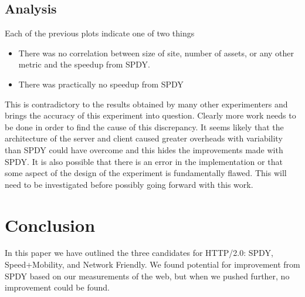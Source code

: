 \documentclass[10pt,letterpaper,notitlepage]{article}
\begin{document}
\subsection{Analysis}
\label{sec:realworld/analysis}
Each of the previous plots indicate one of two things
\begin{itemize}
    \item  There was no correlation between size of site, number of assets, or
        any other metric and the speedup from SPDY.
    \item There was practically no speedup from SPDY
\end{itemize}

This is contradictory to the results obtained by many other experimenters and
brings the accuracy of this experiment into question.  Clearly more work needs
to be done in order to find the cause of this discrepancy.  It seems likely that
the architecture of the server and client caused greater overheads with
variability than SPDY could have overcome and this hides the improvements made
with SPDY. It is also possible that there is an error in the implementation or
that some aspect of the design of the experiment is fundamentally flawed.  This
will need to be investigated before possibly going forward with this work.

\section{Conclusion}
\label{sec:conlusion}
In this paper we have outlined the three candidates for HTTP/2.0: SPDY,
Speed+Mobility, and Network Friendly. We found potential for improvement from
SPDY based on our measurements of the web, but when we pushed further, no
improvement could be found.
\end{document}
